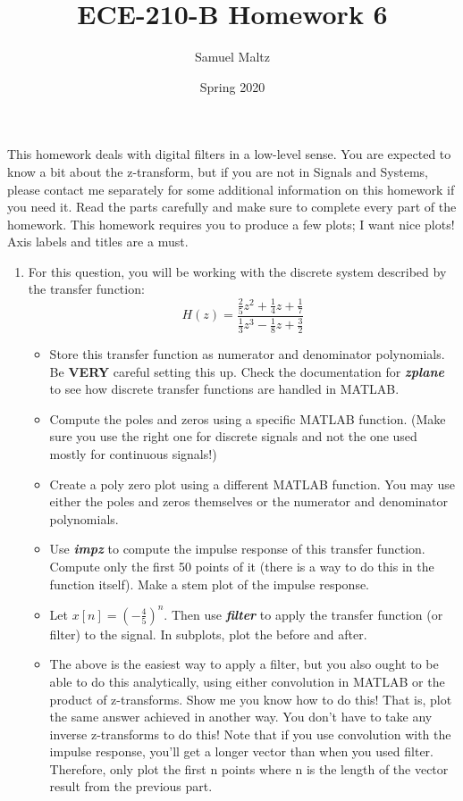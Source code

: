 \documentclass[12pt]{article}
\title{ECE-210-B Homework 6}
\author{Samuel Maltz}
\date{Spring 2020}
\begin{document}
\noindent This homework deals with digital filters in a low-level sense. You are expected to know a bit about the z-transform, but if you are not in Signals and Systems, please contact me separately for some additional information on this homework if you need it. Read the parts carefully and make sure to complete every part of the homework. This homework requires you to produce a few plots; I want nice plots! Axis labels and titles are a must.

\begin{enumerate}
\item For this question, you will be working with the discrete system described by the transfer function:
$$H(z) = \frac{\frac{2}{5}z^2 + \frac{1}{4}z + \frac{1}{7}}{\frac{1}{3}z^3 - \frac{1}{8}z + \frac{3}{2}}$$
	\begin{itemize}
	\item Store this transfer function as numerator and denominator polynomials. Be \textbf{VERY} careful setting this up. Check the documentation for \textbf{\textit{zplane}} to see how discrete transfer functions are handled in MATLAB.
	\item Compute the poles and zeros using a specific MATLAB function. (Make sure you use the right one for discrete signals and not the one used mostly for continuous signals!)
	\item Create a poly zero plot using a different MATLAB function. You may use either the poles and zeros themselves or the numerator and denominator polynomials.
	\item Use \textbf{\textit{impz}} to compute the impulse response of this transfer function. Compute only the first 50 points of it (there is a way to do this in the function itself). Make a stem plot of the impulse response.
	\item Let $x[n] = (-\frac{4}{5})^n$. Then use \textbf{\textit{filter}} to apply the transfer function (or filter) to the signal. In subplots, plot the before and after.
	\item  The above is the easiest way to apply a filter, but you also ought to be able to do this analytically, using either convolution in MATLAB or the product of z-transforms. Show me you know how to do this! That is, plot the same answer achieved in another way. You don't have to take any inverse z-transforms to do this! Note that if you use convolution with the impulse response, you'll get a longer vector than when you used filter. Therefore, only plot the first n points where n is the length of the vector result from the previous part.

\end{itemize}
\end{enumerate}
\end{document}
